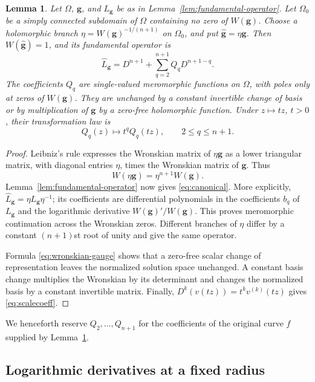 \documentclass[11pt,letterpaper,reqno]{amsart}
\newtheorem{lem}[thm]{Lemma}
\theoremstyle{remark}
\numberwithin{equation}{section}
\newcommand{\gv}{\bm g}
\begin{document}
\begin{lem}\label{lem:canonical-gauge}
Let $\Omega$, $\gv$, and $L_{\gv}$ be as in
Lemma~\ref{lem:fundamental-operator}. Let $\Omega_0$ be a simply connected
subdomain of $\Omega$ containing no zero of $W(\gv)$. Choose a holomorphic
branch $\eta=W(\gv)^{-1/(n+1)}$ on $\Omega_0$, and put
$\widehat{\gv}=\eta\gv$. Then
$W(\widehat{\gv})=1$, and its fundamental operator is
\begin{equation}\label{eq:canonical}
 \widehat L_{\gv}=D^{n+1}+\sum_{q=2}^{n+1} Q_qD^{n+1-q}.
\end{equation}
The coefficients $Q_q$ are single-valued meromorphic functions on $\Omega$,
with poles only at zeros of $W(\gv)$. They are unchanged by a constant
invertible change of basis or by multiplication of $\gv$ by a zero-free
holomorphic function. Under $z\mapsto tz$, $t>0$, their transformation law is
\begin{equation}\label{eq:scalecoeff}
 Q_q(z)\longmapsto t^qQ_q(tz),\qquad 2\le q\le n+1.
\end{equation}
\end{lem}
\begin{proof}
Leibniz's rule expresses the Wronskian matrix of $\eta\gv$ as a lower
triangular matrix, with diagonal entries $\eta$, times the Wronskian matrix
of $\gv$. Thus
\begin{equation}\label{eq:wronskian-gauge}
 W(\eta\gv)=\eta^{n+1}W(\gv).
\end{equation}
Lemma~\ref{lem:fundamental-operator} now gives \eqref{eq:canonical}.
More explicitly, $\widehat L_{\gv}=\eta L_{\gv}\eta^{-1}$; its coefficients
are differential polynomials in the coefficients $b_q$ of $L_{\gv}$
and the logarithmic derivative $W(\gv)'/W(\gv)$. This proves
meromorphic continuation across the Wronskian zeros. Different branches of
$\eta$ differ by a constant $(n+1)$st root of unity and give the same operator.

Formula \eqref{eq:wronskian-gauge} shows that a zero-free scalar change of
representation leaves the normalized solution space unchanged. A constant
basis change multiplies the Wronskian by its determinant and changes the
normalized basis by a constant invertible matrix. Finally,
$D^k(v(tz))=t^kv^{(k)}(tz)$ gives \eqref{eq:scalecoeff}.
\end{proof}

We henceforth reserve $Q_2,\ldots,Q_{n+1}$ for the coefficients of the
original curve $f$ supplied by Lemma~\ref{lem:canonical-gauge}.

\subsection{Logarithmic derivatives at a fixed radius}
\end{document}

